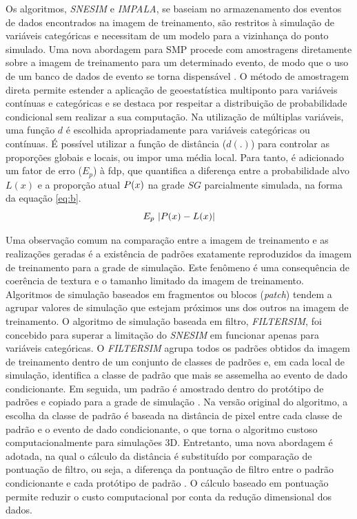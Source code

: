 \documentclass[11pt]{article}
\begin{document}
Os algoritmos, \emph{SNESIM} e \emph{IMPALA}, se baseiam no armazenamento dos eventos de dados encontrados na imagem de treinamento, são restritos 
à simulação de variáveis categóricas e necessitam de um modelo para a vizinhança do ponto simulado. Uma nova abordagem para SMP procede com 
amostragens diretamente sobre a imagem de treinamento para um determinado evento, de modo que o uso de um banco de dados de evento se torna 
dispensável \cite{Mariethoz_2010} \cite{Meerschman_13}. O método de amostragem direta permite estender a aplicação de geoestatística multiponto para variáveis contínuas 
e categóricas e se destaca por respeitar a distribuição de probabilidade condicional sem realizar a sua computação. Na utilização de múltiplas 
variáveis, uma função $d$ é escolhida apropriadamente para variáveis categóricas ou contínuas. É possível utilizar a função de distância ($d(.)$) 
para controlar as proporções globais e locais, ou impor uma média local. Para tanto, é adicionado um fator de erro ($E_p$) à fdp, que quantifica a 
diferença entre a probabilidade alvo $L(x)$ e a proporção atual $P\*(x)$ na grade $SG$ parcialmente simulada, na forma da equação \ref{eq:b}.
\begin{equation}
 E_p ~ |P\*(x) - L(x)|
\label{eq:b}
\end{equation}

Uma observação comum na comparação entre a imagem de treinamento e as realizações geradas é a existência de padrões exatamente reproduzidos da imagem de treinamento para a
grade de simulação. Este fenômeno é uma consequência de coerência de textura e o tamanho limitado da imagem de treinamento. Algoritmos de simulação
baseados em fragmentos ou blocos (\emph{patch}) tendem a agrupar valores de simulação que estejam próximos uns dos outros na imagem de treinamento.
O algoritmo de simulação baseada em filtro, \emph{FILTERSIM}, foi concebido para superar a limitação do \emph{SNESIM} em funcionar apenas para
variáveis categóricas.
O \emph{FILTERSIM} agrupa todos os padrões obtidos da imagem de treinamento dentro de um conjunto de classes de padrões e, em cada local de simulação, identifica a
classe de padrão que mais se assemelha ao evento de dado condicionante. Em seguida, um padrão é amostrado dentro do protótipo de padrões e
copiado para a grade de simulação \cite{Zhang2006}. Na versão original do algoritmo, a escolha da classe de padrão é baseada na distância
de pixel entre cada classe de padrão e o evento de dado condicionante, o que torna o algoritmo custoso computacionalmente
para simulações 3D. Entretanto, uma nova abordagem é adotada, na qual o cálculo da distância é substituído por comparação de pontuação de
filtro, ou seja, a diferença da pontuação de filtro entre o padrão condicionante e cada protótipo de padrão \cite{Wu2008}. O cálculo baseado em
pontuação permite reduzir o custo computacional por conta da redução dimensional dos dados.
\end{document}
